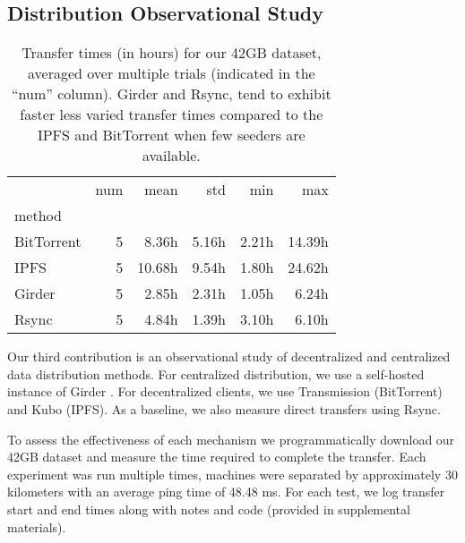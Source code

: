 \documentclass[10pt,twocolumn,letterpaper]{article}
\begin{document}
\subsection{Distribution Observational Study}

\begin{table}[t]
\begin{tabular}{lrrrrr}
\toprule
{}      & num &   mean &    std &   min &    max \\
method         &       &        &       &       & \\
\midrule
BitTorrent & 5 &  8.36h &   5.16h &  2.21h & 14.39h \\
IPFS       & 5 & 10.68h & 9.54h & 1.80h & 24.62h \\
Girder     & 5 & 2.85h  &  2.31h  & 1.05h & 6.24h \\
Rsync      & 5 & 4.84h & 1.39h & 3.10h & 6.10h \\

\bottomrule
\end{tabular}
\caption[]{
Transfer times (in hours) for our 42GB dataset, averaged over multiple trials (indicated in the ``num'' column).
Girder and Rsync, tend to exhibit faster less varied transfer times compared to
the IPFS and BitTorrent when few seeders are available.
}
\label{tab:transfertime}
\end{table}

Our third contribution is an observational study of decentralized and centralized data distribution methods.
For centralized distribution, we use a self-hosted instance of Girder
  \cite{girder_2024}.
For decentralized clients, we use Transmission \cite{transmission_2024} (BitTorrent)
  and Kubo \cite{ipfskubo_2024} (IPFS).
As a baseline, we also measure direct transfers using Rsync\cite{rsyncprojectrsync_2024}.


To assess the effectiveness of each mechanism we programmatically download our 42GB dataset and measure the
  time required to complete the transfer.
Each experiment was run multiple times, machines were separated by approximately 30 kilometers with an
  average ping time of 48.48 ms.
For each test, we log transfer start and end times along with notes and code (provided in supplemental
  materials).
\end{document}
